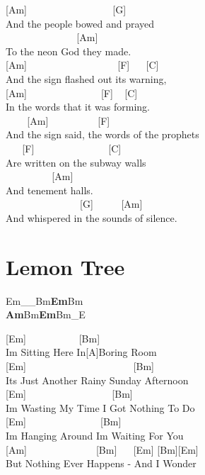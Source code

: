\documentclass[
  letterpaper,
]{scrbook}
\begin{document}
{[}Am{]} ~ ~ ~ ~ ~ ~ ~ ~ ~ ~ {[}G{]}\\
And the people bowed and prayed\\
\hspace*{0.333em} ~ ~ ~ ~ ~ ~ ~ ~ ~{[}Am{]}\\
To the neon God they made.\\
{[}Am{]} ~ ~ ~ ~ ~ ~ ~ ~ ~ ~ ~{[}F{]} ~ ~{[}C{]}\\
And the sign flashed out its warning,\\
{[}Am{]} ~ ~ ~ ~ ~ ~ ~ ~ ~{[}F{]} ~ {[}C{]}\\
In the words that it was forming.\\
\hspace*{0.333em} ~ ~ ~{[}Am{]} ~ ~ ~ ~ ~ ~{[}F{]}\\
And the sign said, the words of the prophets\\
\hspace*{0.333em} ~ ~ {[}F{]} ~ ~ ~ ~ ~ ~ ~ ~ ~{[}C{]}\\
Are written on the subway walls\\
\hspace*{0.333em} ~ ~ ~ ~ ~ ~{[}Am{]}\\
And tenement halls.\\
\hspace*{0.333em} ~ ~ ~ ~ ~ ~ ~ ~ ~ {[}G{]} ~ ~ ~ {[}Am{]} ~ ~\\
And whispered in the sounds of silence.

\hypertarget{lemon-tree}{%
\chapter{Lemon Tree}\label{lemon-tree}}

Em\_\_\textbar Bm\textbf{\textbar Em}\textbar Bm\textbf{\textbar{}\\
Am}\textbar Bm\textbf{\textbar Em}\textbar Bm\_E\textbar{}

{[}Em{]} ~ ~ ~ ~ ~ ~ {[}Bm{]}\\
I\textquotesingle m Sitting Here In{[}A{]}Boring Room\\
{[}Em{]} ~ ~ ~ ~ ~ ~ ~ ~ ~ ~ ~ ~ ~{[}Bm{]}\\
It\textquotesingle s Just Another Rainy Sunday Afternoon\\
{[}Em{]} ~ ~ ~ ~ ~ ~ ~ ~ ~ ~ {[}Bm{]}\\
I\textquotesingle m Wasting My Time I Got Nothing To Do\\
{[}Em{]} ~ ~ ~ ~ ~ ~ ~ ~ ~{[}Bm{]}\\
I\textquotesingle m Hanging Around I\textquotesingle m Waiting For You\\
\hspace*{0.333em} {[}Am{]} ~ ~ ~ ~ ~ ~ ~ ~ {[}Bm{]} ~ ~{[}Em{]}
{[}Bm{]}{[}Em{]}\\
But Nothing Ever Happens - And I Wonder
\end{document}
